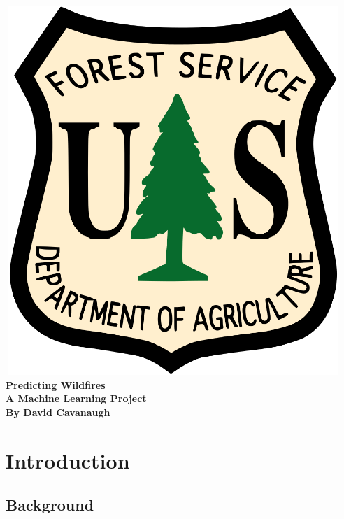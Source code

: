 \documentclass[12pt]{article}
\begin{document}
\begin{titlepage}
   \begin{center}
	\Huge
	\vspace*{0.1in}
	\includegraphics[width=5in, height=5.5in]{ForestryServiceImage.png} \\
	\vspace{0.5in}
       \Huge \textbf{Predicting Wildfires} \\
	\vspace{0.5in}
	\Large \textbf{A Machine Learning Project} \\
	\vspace{0.1in}
	\large \textbf{By David Cavanaugh}
	\vspace{0.9in}
	\end{center}
	\large

\end{titlepage}

\section{\textrm{\LARGE Introduction}}   \label{sec:introduction}

\subsection{\textrm{Background}} 
\end{document}
